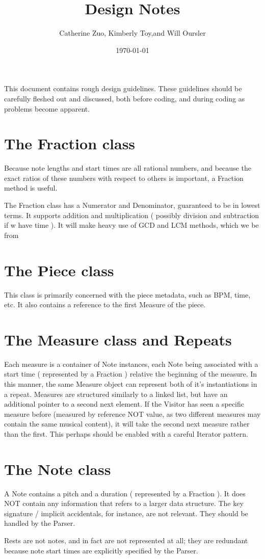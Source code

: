 

\author{ Catherine Zuo, Kimberly Toy,and Will Oursler}
\title{Design Notes}
\date{\today}
\maketitle

This document contains rough design guidelines. These guidelines should be carefully fleshed out and discussed, both before coding, and during coding as problems become apparent.

\section{ The Fraction class }

Because note lengths and start times are all rational numbers, and because the exact ratios of these numbers with respect to others is important, a Fraction method is useful.

The Fraction class has a Numerator and Denominator, guaranteed to be in lowest terms. It supports addition and multiplication ( possibly division and subtraction if w have time ). It will make heavy use of GCD and LCM methods, which we be from %

\section{ The Piece class }

This class is primarily concerned with the piece metadata, such as BPM, time, etc. It also contains a reference to the first Measure of the piece.

\section{ The Measure class and Repeats }

Each measure is a container of Note instances, each Note being associated with a start time ( represented by a Fraction ) relative the beginning of the measure. In this manner, the same Measure object can represent both of it's instantiations in a repeat. Measures are structured similarly to a linked list, but have an additional pointer to a second next element. If the Visitor has seen a specific measure before (measured by reference NOT value, as two different measures may contain the same musical content), it will take the second next measure rather than the first. This perhaps should be enabled with a careful Iterator pattern.

\section{ The Note class }
A Note contains a pitch and a duration  ( represented by a Fraction ).  It does NOT contain any information that refers to a larger data structure. The key signature / implicit accidentals, for instance, are not relevant. They should be handled by the Parser.

Rests are not notes, and in fact are not represented at all; they are redundant because note start times are explicitly specified by the Parser.


